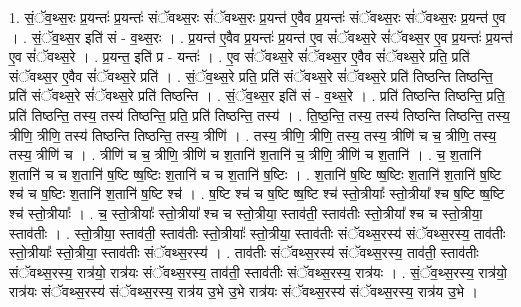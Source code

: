 \documentclass[17pt]{extarticle}
\begin{document}
1. सं॒ॅव॒थ्स॒रः प्र॒यन्तः॑ प्र॒यन्तः॑ संॅवथ्स॒रः सं॑ॅवथ्स॒रः प्र॒यन्त॑ ए॒वैव प्र॒यन्तः॑ संॅवथ्स॒रः सं॑ॅवथ्स॒रः प्र॒यन्त॑ ए॒व । . सं॒ॅव॒थ्स॒र इति॑ सं - व॒थ्स॒रः । . प्र॒यन्त॑ ए॒वैव प्र॒यन्तः॑ प्र॒यन्त॑ ए॒व सं॑ॅवथ्स॒रे सं॑ॅवथ्स॒र ए॒व प्र॒यन्तः॑ प्र॒यन्त॑ ए॒व सं॑ॅवथ्स॒रे । . प्र॒यन्त॒ इति॑ प्र - यन्तः॑ । . ए॒व सं॑ॅवथ्स॒रे सं॑ॅवथ्स॒र ए॒वैव सं॑ॅवथ्स॒रे प्रति॒ प्रति॑ संॅवथ्स॒र ए॒वैव सं॑ॅवथ्स॒रे प्रति॑ । . सं॒ॅव॒थ्स॒रे प्रति॒ प्रति॑ संॅवथ्स॒रे सं॑ॅवथ्स॒रे प्रति॑ तिष्ठन्ति तिष्ठन्ति॒ प्रति॑ संॅवथ्स॒रे सं॑ॅवथ्स॒रे प्रति॑ तिष्ठन्ति । . सं॒ॅव॒थ्स॒र इति॑ सं - व॒थ्स॒रे । . प्रति॑ तिष्ठन्ति तिष्ठन्ति॒ प्रति॒ प्रति॑ तिष्ठन्ति॒ तस्य॒ तस्य॑ तिष्ठन्ति॒ प्रति॒ प्रति॑ तिष्ठन्ति॒ तस्य॑ । . ति॒ष्ठ॒न्ति॒ तस्य॒ तस्य॑ तिष्ठन्ति तिष्ठन्ति॒ तस्य॒ त्रीणि॒ त्रीणि॒ तस्य॑ तिष्ठन्ति तिष्ठन्ति॒ तस्य॒ त्रीणि॑ । . तस्य॒ त्रीणि॒ त्रीणि॒ तस्य॒ तस्य॒ त्रीणि॑ च च॒ त्रीणि॒ तस्य॒ तस्य॒ त्रीणि॑ च । . त्रीणि॑ च च॒ त्रीणि॒ त्रीणि॑ च श॒तानि॑ श॒तानि॑ च॒ त्रीणि॒ त्रीणि॑ च श॒तानि॑ । . च॒ श॒तानि॑ श॒तानि॑ च च श॒तानि॑ ष॒ष्टि ष्ष॒ष्टिः श॒तानि॑ च च श॒तानि॑ ष॒ष्टिः । . श॒तानि॑ ष॒ष्टि ष्ष॒ष्टिः श॒तानि॑ श॒तानि॑ ष॒ष्टि श्च॑ च ष॒ष्टिः श॒तानि॑ श॒तानि॑ ष॒ष्टि श्च॑ । . ष॒ष्टि श्च॑ च ष॒ष्टि ष्ष॒ष्टि श्च॑ स्तो॒त्रीयाः᳚ स्तो॒त्रीया᳚ श्च ष॒ष्टि ष्ष॒ष्टि श्च॑ स्तो॒त्रीयाः᳚ । . च॒ स्तो॒त्रीयाः᳚ स्तो॒त्रीया᳚ श्च च स्तो॒त्रीया॒ स्ताव॑ती॒ स्ताव॑तीः स्तो॒त्रीया᳚ श्च च स्तो॒त्रीया॒ स्ताव॑तीः । . स्तो॒त्रीया॒ स्ताव॑ती॒ स्ताव॑तीः स्तो॒त्रीयाः᳚ स्तो॒त्रीया॒ स्ताव॑तीः संॅवथ्स॒रस्य॑ संॅवथ्स॒रस्य॒ ताव॑तीः स्तो॒त्रीयाः᳚ स्तो॒त्रीया॒ स्ताव॑तीः संॅवथ्स॒रस्य॑ । . ताव॑तीः संॅवथ्स॒रस्य॑ संॅवथ्स॒रस्य॒ ताव॑ती॒ स्ताव॑तीः संॅवथ्स॒रस्य॒ रात्र॑यो॒ रात्र॑यः संॅवथ्स॒रस्य॒ ताव॑ती॒ स्ताव॑तीः संॅवथ्स॒रस्य॒ रात्र॑यः । . सं॒ॅव॒थ्स॒रस्य॒ रात्र॑यो॒ रात्र॑यः संॅवथ्स॒रस्य॑ संॅवथ्स॒रस्य॒ रात्र॑य उ॒भे उ॒भे रात्र॑यः संॅवथ्स॒रस्य॑ संॅवथ्स॒रस्य॒ रात्र॑य उ॒भे । \newline
\end{document}
